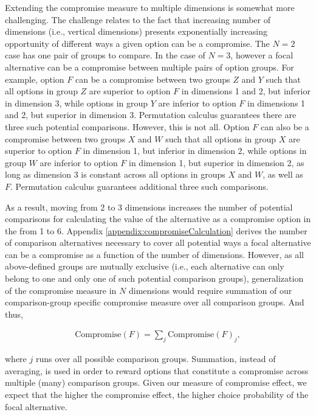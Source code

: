 \documentclass[a4paper,12pt]{article}
\begin{document}
Extending the compromise measure to multiple dimensions is somewhat more challenging. The challenge relates to the fact that increasing number of dimensions (i.e., vertical dimensions) presents exponentially increasing opportunity of different ways a given option can be a compromise. The $N = 2$ case has one pair of groups to compare. In the case of $N = 3$, however a focal alternative can be a compromise between multiple pairs of option groups. For example, option $F$ can be a compromise between two groups $Z$ and $Y$ such that all options in group $Z$ are superior to option $F$ in dimensions 1 and 2, but inferior in dimension 3, while options in group $Y$ are inferior to option $F$ in dimensions 1 and 2, but superior in dimension 3. Permutation calculus guarantees there are three such potential comparisons. However, this is not all. Option $F$ can also be a compromise between two groups $X$ and $W$ such that all options in group $X$ are superior to option $F$ in dimension 1, but inferior in dimension 2, while options in group $W$ are inferior to option $F$ in dimension 1, but superior in dimension 2, as long as dimension 3 is constant across all options in groups $X$ and $W$, as well as $F$. Permutation calculus guarantees additional three such comparisons.

As a result, moving from 2 to 3 dimensions increases the number of potential comparisons for calculating the value of the alternative as a compromise option in the from 1 to 6. Appendix \ref{appendix:compromiseCalculation} derives the number of comparison alternatives necessary to cover all potential ways a focal alternative can be a compromise as a function of the number of dimensions. However, as all above-defined groups are mutually exclusive (i.e., each alternative can only belong to one and only one of such potential comparison groups), generalization of the compromise measure in $N$ dimensions would require summation of our comparison-group specific compromise measure over all comparison groups. And thus,

\begin{align}\label{eq:compromiseEffectGeneralFormula}
    \text{Compromise}(F) = \sum_j \text{Compromise}(F)_j ,
\end{align}


 where $j$ runs over all possible comparison groups. Summation, instead of averaging, is used in order to reward options that constitute a compromise across multiple (many) comparison groups. Given our measure of compromise effect, we expect that the higher the compromise effect, the higher choice probability of the focal alternative.    
\end{document}
